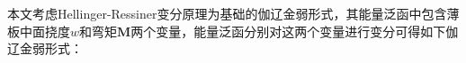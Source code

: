 \documentclass[a4paper]{article}
\begin{document}
本文考虑Hellinger-Ressiner变分原理为基础的伽辽金弱形式，其能量泛函中包含薄板中面挠度$w$和弯矩$\boldsymbol M$两个变量，能量泛函分别对这两个变量进行变分可得如下伽辽金弱形式：
\end{document}
